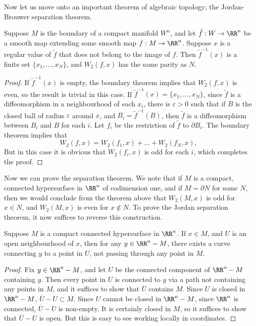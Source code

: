 Now let us move onto an important theorem of algebraic topology; the Jordan-Brouwer separation theorem.

\begin{lemma}
    Suppose $M$ is the boundary of a compact manifold $W^n$, and let $\tilde{f}: W \to \RR^n$ be a smooth map extending some smooth map $f: M \to \RR^n$. Suppose $x$ is a regular value of $\tilde{f}$ that does not belong to the image of $f$. Then $\tilde{f}^{-1}(x)$ is a finite set $\{ x_1, \dots, x_N \}$, and $W_2(f,x)$ has the same parity as $N$.
\end{lemma}
\begin{proof}
    If $\tilde{f}^{-1}(x)$ is empty, the boundary theorem implies that $W_2(f,x)$ is even, so the result is trivial in this case. If $\tilde{f}^{-1}(x) = \{ x_1, \dots, x_N \}$, since $\tilde{f}$ is a diffeomorphism in a neighbourhood of each $x_i$, there is $\varepsilon > 0$ such that if $B$ is the closed ball of radius $\varepsilon$ around $x$, and $B_i = \tilde{f}^{-1}(B)$, then $\tilde{f}$ is a diffeomorphism between $B_i$ and $B$ for each $i$. Let $f_i$ be the restriction of $\tilde{f}$ to $\partial B_i$. The boundary theorem implies that
    \[ W_2(f,x) = W_2(f_1,x) + \dots + W_2(f_N,x), \]
    But in this case it is obvious that $W_2(f_i,x)$ is odd for each $i$, which completes the proof.
\end{proof}

Now we can prove the separation theorem. We note that if $M$ is a compact, connected hypersurface in $\RR^n$ of codimension one, and if $M = \partial N$ for some $N$, then we would conclude from the theorem above that $W_2(M,x)$ is odd for $x \in N$, and $W_2(M,x)$ is even for $x \not \in N$. To prove the Jordan separation theorem, it now suffices to reverse this construction.

\begin{lemma}
    Suppose $M$ is a compact connected hypersurface in $\RR^n$. If $x \in M$, and $U$ is an open neighbourhood of $x$, then for any $y \in \RR^n - M$, there exists a curve connecting $y$ to a point in $U$, not passing through any point in $M$.
\end{lemma}
\begin{proof}
    Fix $y \in \RR^n - M$, and let $U$ be the connected component of $\RR^n - M$ containing $y$. Then every point in $U$ is connected to $y$ via a path not containing any points in $M$, and it suffices to show that $\overline{U}$ contains $M$. Since $U$ is closed in $\RR^n - M$, $\overline{U} - U \subset M$. Since $U$ cannot be closed in $\RR^n - M$, since $\RR^n$ is connected, $\overline{U} - U$ is non-empty. It is certainly closed in $M$, so it suffices to show that $\overline{U} - U$ is open. But this is easy to see working locally in coordinates.
\end{proof}

